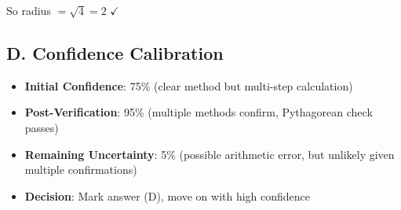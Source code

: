 \documentclass[]{article}
\begin{document}
\begin{verificationbox}
\begin{itemize}[leftmargin=*]
    So radius $= \sqrt{4} = 2$ $\checkmark$
\end{itemize}

\subsection*{D. Confidence Calibration}
\begin{itemize}[leftmargin=*]
    \item \textbf{Initial Confidence}: 75\% (clear method but multi-step calculation)
    \item \textbf{Post-Verification}: 95\% (multiple methods confirm, Pythagorean check passes)
    \item \textbf{Remaining Uncertainty}: 5\% (possible arithmetic error, but unlikely given multiple confirmations)
    \item \textbf{Decision}: Mark answer (D), move on with high confidence
\end{itemize}
\end{verificationbox}
\end{document}
